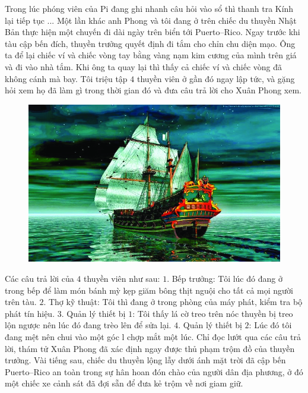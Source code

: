 	\vskip 0.1cm
	Trong lúc phóng viên của Pi đang ghi nhanh câu hỏi vào sổ thì thanh tra Kính lại tiếp tục ...
	\vskip 0.1cm
	{\color{toanhocdoisong}{DU HÀNH TRÊN ĐẠI DƯƠNG}}
	\vskip 0.1cm
	Một lần khác anh Phong và tôi đang ở trên chiếc du thuyền Nhật Bản thực hiện một chuyến đi dài ngày trên biển tới Puerto--Rico. Ngay trước khi tàu cập bến đích, thuyền trưởng quyết định đi tắm cho chỉn chu diện mạo. Ông ta để lại chiếc ví và chiếc vòng tay bằng vàng nạm kim cương của mình trên giá và đi vào nhà tắm. Khi ông ta quay lại thì thấy cả chiếc ví và chiếc vòng đã không cánh mà bay. Tôi triệu tập $4$ thuyền viên ở gần đó ngay lập tức, và gặng hỏi xem họ đã làm gì trong thời gian đó và đưa câu trả lời cho Xuân Phong xem. 
		\begin{figure}[H]
			\centering
			\vspace*{-5pt}
			\captionsetup{labelformat= empty, justification=centering}
			\includegraphics[width=0.7\linewidth]{3}
			\vspace*{-10pt}
		\end{figure}
	Các câu trả lời của $4$ thuyền viên như sau: 
	\vskip 0.1cm
	$1.$ Bếp trưởng: Tôi lúc đó đang ở trong bếp để làm món bánh mỳ kẹp giăm bông thịt nguội cho tất cả mọi người trên tàu. 
	\vskip 0.1cm
	$2.$ Thợ kỹ thuật: Tôi thì đang ở trong phòng của máy phát, kiểm tra bộ phát tín hiệu. 
	\vskip 0.1cm
	$3.$ Quản lý thiết bị $1$: Tôi thấy lá cờ treo trên nóc thuyền bị treo lộn ngược nên lúc đó đang trèo lên để sửa lại. 
	\vskip 0.1cm
	$4.$ Quản lý thiết bị $2$: Lúc đó tôi đang mệt nên chui vào một góc l chợp mắt một lúc. 
	\vskip 0.1cm
	Chỉ đọc lướt qua các câu trả lời, thám tử Xuân Phong đã xác định ngay được thủ phạm trộm đồ của thuyền trưởng. Vài tiếng sau, chiếc du thuyền lộng lẫy dưới ánh mặt trời đã cập bến Puerto--Rico an toàn trong sự hân hoan đón chào của người dân địa phương, ở đó một chiếc xe cảnh sát đã đợi sẵn để đưa kẻ trộm về nơi giam giữ. 
